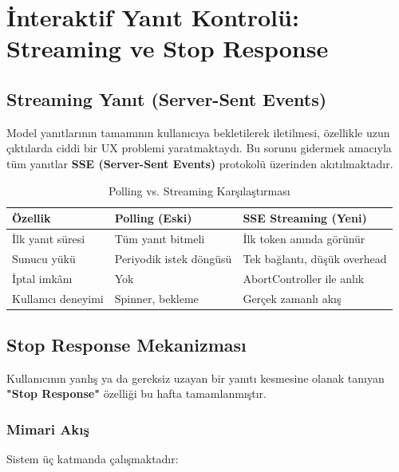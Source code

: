 \documentclass[12pt,a4paper]{article}
\begin{document}
\section{İnteraktif Yanıt Kontrolü: Streaming ve Stop Response}

\subsection{Streaming Yanıt (Server-Sent Events)}

Model yanıtlarının tamamının kullanıcıya bekletilerek iletilmesi, özellikle uzun çıktılarda ciddi bir UX problemi yaratmaktaydı. Bu sorunu gidermek amacıyla tüm yanıtlar \textbf{SSE (Server-Sent Events)} protokolü üzerinden akıtılmaktadır.

\begin{table}[H]
\centering
\caption{Polling vs. Streaming Karşılaştırması}
\begin{tabularx}{\textwidth}{@{} l X X @{}}
\toprule
\textbf{Özellik} & \textbf{Polling (Eski)} & \textbf{SSE Streaming (Yeni)} \\
\midrule
İlk yanıt süresi & Tüm yanıt bitmeli & İlk token anında görünür \\
Sunucu yükü & Periyodik istek döngüsü & Tek bağlantı, düşük overhead \\
İptal imkânı & Yok & AbortController ile anlık \\
Kullanıcı deneyimi & Spinner, bekleme & Gerçek zamanlı akış \\
\bottomrule
\end{tabularx}
\end{table}

\subsection{Stop Response Mekanizması}

Kullanıcının yanlış ya da gereksiz uzayan bir yanıtı kesmesine olanak tanıyan \textbf{"Stop Response"} özelliği bu hafta tamamlanmıştır.

\subsubsection{Mimari Akış}

Sistem üç katmanda çalışmaktadır:
\end{document}
